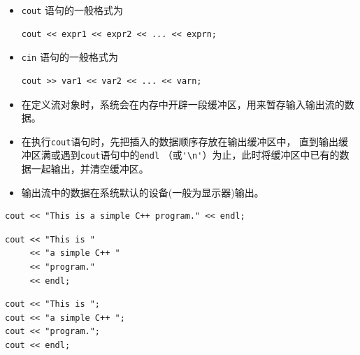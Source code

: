 \begin{frame}[fragile]{\secname}
  \begin{itemize}
  \item \lstinline|cout| 语句的一般格式为
    \begin{lstlisting}
cout << expr1 << expr2 << ... << exprn;      
    \end{lstlisting}
  \item \lstinline|cin| 语句的一般格式为
    \begin{lstlisting}
cout >> var1 << var2 << ... << varn;      
    \end{lstlisting}
  \end{itemize} \pause 

  \begin{itemize}
  \item   在定义流对象时，系统会在内存中开辟一段缓冲区，用来暂存输入输出流的数据。


  \item 在执行\lstinline|cout|语句时，先把插入的数据顺序存放在输出缓冲区中，
  直到输出缓冲区满或遇到\lstinline|cout|语句中的\lstinline|endl|
  （或\lstinline|'\n'|）为止，此时将缓冲区中已有的数据一起输出，并清空缓冲区。

  \item 输出流中的数据在系统默认的设备(一般为显示器)输出｡

  \end{itemize}
\end{frame}

\begin{frame}[fragile]{\secname}
  \begin{lstlisting}
cout << "This is a simple C++ program." << endl;    
\end{lstlisting}\pause
\begin{lstlisting}
cout << "This is "
     << "a simple C++ "
     << "program."
     << endl;    
  \end{lstlisting}\pause
\begin{lstlisting}
cout << "This is ";
cout << "a simple C++ ";
cout << "program.";
cout << endl;    
  \end{lstlisting}
\end{frame}

